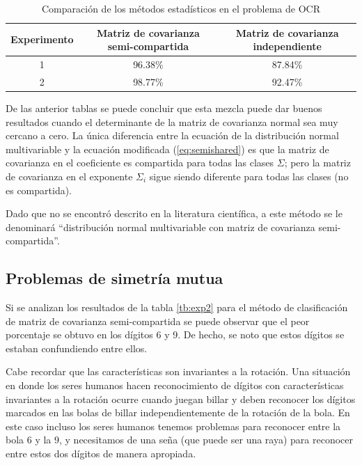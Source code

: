 \documentclass[a4paper, 11pt, oneside]{report}
\begin{document}
	\begin{table}
	\begin{center}
	\begin{tabular}{|c|c|c|}		
		\hline
		Experimento & Matriz de covarianza semi-compartida & Matriz de covarianza independiente \\
		\hline
		1 & 96.38\% & 87.84\% \\
		2 & 98.77\% & 92.47\% \\
		\hline		
	\end{tabular}
	\end{center}
	\caption{Comparación de los métodos estadísticos en el problema de OCR}	
	\label{tb:classifResult}
	\end{table}

De las anterior tablas se puede concluir que esta mezcla puede dar buenos resultados cuando el determinante de la matriz de covarianza normal sea muy cercano a cero. La única diferencia entre la ecuación de la distribución normal multivariable y la ecuación modificada (\ref{eq:semishared}) es que la matriz de covarianza en el coeficiente es compartida para todas las clases $\Sigma$; pero la matriz de covarianza en el exponente $\Sigma_i$ sigue siendo diferente para todas las clases (no es compartida).

Dado que no se encontró descrito en la literatura científica, a este método se le denominará ``distribución normal multivariable con matriz de covarianza semi-compartida''.

\subsection{Problemas de simetría mutua}
\label{sect:mutualSym}

Si se analizan los resultados de la tabla \ref{tb:exp2} para el método de clasificación de matriz de covarianza semi-compartida se puede observar que el peor porcentaje se obtuvo en los dígitos 6 y 9. De hecho, se noto que estos dígitos se estaban confundiendo entre ellos.
 
Cabe recordar que las características son invariantes a la rotación. Una situación en donde los seres humanos hacen reconocimiento de dígitos con características invariantes a la rotación ocurre cuando juegan billar y deben reconocer los dígitos marcados en las bolas de billar independientemente de la rotación de la bola. En este caso incluso los seres humanos tenemos problemas para reconocer entre la bola 6 y la 9, y necesitamos de una seña (que puede ser una raya) para reconocer entre estos dos dígitos de manera apropiada.
\end{document}
